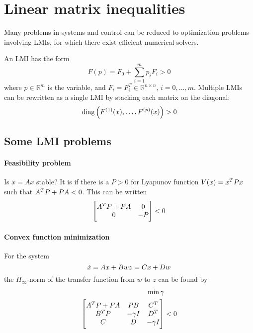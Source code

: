 \section{Linear matrix inequalities}
Many problems in systems and control can be reduced to optimization problems involving LMIs, for which there exist efficient numerical solvers.

An LMI has the form
%
\begin{equation}
  F(p) = F_0 + \sum_{i=1}^m p_i F_i > 0
\end{equation}
%
where $p \in \mathbb{R}^m$ is the variable, and $F_i = F_i^T \in \mathbb{R}^{n \times n}$, $i = 0, \dots, m$. Multiple LMIs can be rewritten as a single LMI by stacking each matrix on the diagonal:
%
\begin{equation}
  \operatorname{diag} \left( F^{(1)}(x), \dots, F^{(p)}(x) \right) > 0
\end{equation}

\subsection{Some LMI problems}
\paragraph{Feasibility problem} Is $\dot{x} = Ax$ stable? It is if there is a $P > 0$ for Lyapunov function $V(x) = x^{T} P x$ such that $A^{T} P + PA < 0$. This can be written
%
\begin{equation}
  \begin{bmatrix}
    A^{T} P + PA & 0 \\
    0 & -P
  \end{bmatrix}
  < 0
\end{equation}

\paragraph{Convex function minimization} For the system
%
\begin{equation}
  \dot{x} = Ax + Bw \\
  z = Cx + Dw
\end{equation}
%
the $H_\infty$-norm of the transfer function from $w$ to $z$ can be found by
%
\begin{equation}
\begin{split}
  \min \gamma & \\
  \begin{bmatrix}
    A^{T} P + PA & PB & C^{T} \\
    B^{T} P & -\gamma I & D^{T} \\
    C & D & -\gamma I
  \end{bmatrix}
  & < 0
\end{split}
\end{equation}

